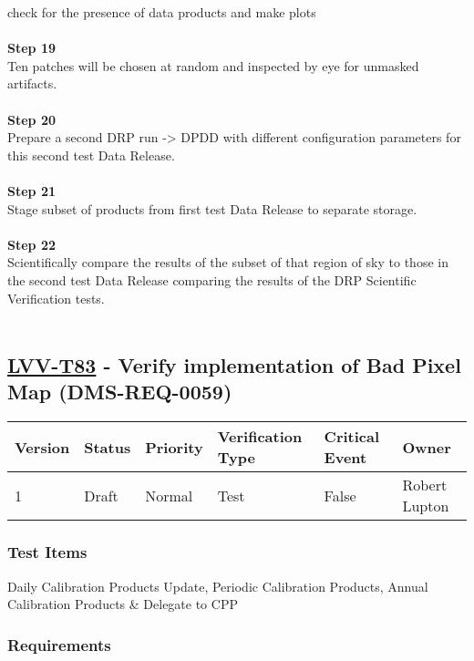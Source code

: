 check for the presence of data products and make plots\\
~\\
\textbf{Step 19}\\
Ten patches will be chosen at random and inspected by eye for unmasked
artifacts.\\
~\\
\textbf{Step 20}\\
Prepare a second DRP run -\textgreater{} DPDD with different
configuration parameters for this second test Data Release.\\
~\\
\textbf{Step 21}\\
Stage subset of products from first test Data Release to separate
storage.\\
~\\
\textbf{Step 22}\\
Scientifically compare the results of the subset of that region of sky
to those in the second test Data Release comparing the results of the
DRP Scientific Verification tests.\\
~\\

\hypertarget{lvv-t83---verify-implementation-of-bad-pixel-map-dms-req-0059}{%
\subsection{\texorpdfstring{\href{https://jira.lsstcorp.org/secure/Tests.jspa\#/testCase/LVV-T83}{LVV-T83}
- Verify implementation of Bad Pixel Map
(DMS-REQ-0059)}{LVV-T83 - Verify implementation of Bad Pixel Map (DMS-REQ-0059)}}\label{lvv-t83---verify-implementation-of-bad-pixel-map-dms-req-0059}}

\begin{longtable}[]{@{}llllll@{}}
\toprule
Version & Status & Priority & Verification Type & Critical Event &
Owner\tabularnewline
\midrule
\endhead
1 & Draft & Normal & Test & False & Robert Lupton\tabularnewline
\bottomrule
\end{longtable}

\hypertarget{test-items-172}{%
\subsubsection{Test Items}\label{test-items-172}}

Daily Calibration Products Update, Periodic Calibration Products, Annual
Calibration Products \& Delegate to CPP

\hypertarget{requirements-173}{%
\subsubsection{Requirements}\label{requirements-173}}

